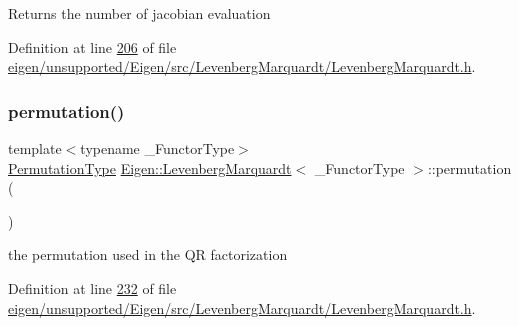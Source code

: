 \begin{DoxyReturn}{Returns}
the number of jacobian evaluation 
\end{DoxyReturn}


Definition at line \hyperlink{eigen_2unsupported_2_eigen_2src_2_levenberg_marquardt_2_levenberg_marquardt_8h_source_l00206}{206} of file \hyperlink{eigen_2unsupported_2_eigen_2src_2_levenberg_marquardt_2_levenberg_marquardt_8h_source}{eigen/unsupported/\+Eigen/src/\+Levenberg\+Marquardt/\+Levenberg\+Marquardt.\+h}.

\mbox{\label{class_eigen_1_1_levenberg_marquardt_a691142ba877e072c58016b4be77e9855}} 
\subsubsection{\texorpdfstring{permutation()}{permutation()}\hspace{0.1cm}{\footnotesize\ttfamily [1/2]}}
{\footnotesize\ttfamily template$<$typename \+\_\+\+Functor\+Type$>$ \\
\hyperlink{group___core___module}{Permutation\+Type} \hyperlink{class_eigen_1_1_levenberg_marquardt}{Eigen\+::\+Levenberg\+Marquardt}$<$ \+\_\+\+Functor\+Type $>$\+::permutation (\begin{DoxyParamCaption}{ }\end{DoxyParamCaption})\hspace{0.3cm}{\ttfamily [inline]}}

the permutation used in the QR factorization 

Definition at line \hyperlink{eigen_2unsupported_2_eigen_2src_2_levenberg_marquardt_2_levenberg_marquardt_8h_source_l00232}{232} of file \hyperlink{eigen_2unsupported_2_eigen_2src_2_levenberg_marquardt_2_levenberg_marquardt_8h_source}{eigen/unsupported/\+Eigen/src/\+Levenberg\+Marquardt/\+Levenberg\+Marquardt.\+h}.

\mbox{\label{class_eigen_1_1_levenberg_marquardt_a691142ba877e072c58016b4be77e9855}} 
